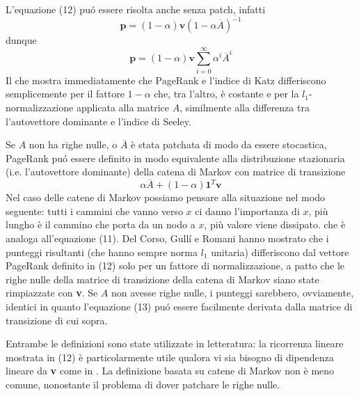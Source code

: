 L'equazione (12) puó essere risolta anche senza patch, infatti
\begin{equation}
    \textbf{p} = (1 - \alpha)\textbf{v}(1 - \alpha\overline{A})^{-1}
\end{equation}
dunque
\begin{equation*}
    \textbf{p} = (1 - \alpha)\textbf{v}\sum_{i = 0}^{\infty}{\alpha^i\overline{A}^i}
\end{equation*}
Il che mostra immediatamente che PageRank e l'indice di Katz differiscono semplicemente per il fattore $1 - \alpha$ che, tra l'altro, è costante e per la $l_1$-normalizzazione applicata alla matrice $A$, similmente alla differenza tra l'autovettore dominante e l'indice di Seeley.

Se $A$ non ha righe nulle, o $\overline{A}$ è stata patchata di modo da essere stocastica, PageRank puó essere definito in modo equivalente alla distribuzione stazionaria (i.e. l'autovettore dominante) della catena di Markov con matrice di transizione
\begin{equation*}
    \alpha\overline{A} + (1 - \alpha)\textbf{1}^T\textbf{v}
\end{equation*}
Nel caso delle catene di Markov possiamo pensare alla situazione nel modo seguente: tutti i cammini che vanno verso $x$ ci danno l'importanza di $x$, più lungho è il cammino che porta da un nodo a $x$, più valore viene dissipato.
che è analoga all'equazione (11). Del Corso, Gullí e Romani \cite{fastprank} hanno mostrato che i punteggi risultanti (che hanno sempre norma $l_1$ unitaria) differiscono dal vettore PageRank definito in (12) solo per un fattore di normalizzazione, a patto che le righe nulle della matrice di transizione della catena di Markov siano state rimpiazzate con \textbf{v}. Se $A$ non avesse righe nulle, i punteggi sarebbero, ovviamente, identici in quanto l'equazione (13) puó essere facilmente derivata dalla matrice di transizione di cui sopra.

Entrambe le definizioni sono state utilizzate in letteratura: la ricorrenza lineare mostrata in (12) è particolarmente utile qualora vi sia bisogno di dipendenza lineare da \textbf{v} come in \cite{boldivigni}. La definizione basata su catene di Markov non è meno comune, nonostante il problema di dover patchare le righe nulle.
